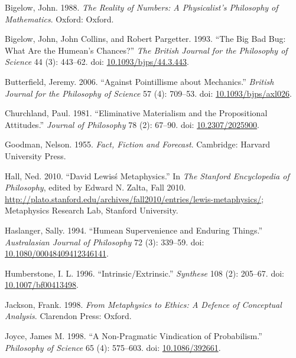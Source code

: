 \documentclass[
  11pt,
  letterpaper,
  DIV=11,
  numbers=noendperiod,
  twoside]{scrartcl}
\newlength{\cslhangindent}
\newenvironment{CSLReferences}[2] %
 {\begin{list}{}{%
  \setlength{\itemindent}{0pt}
  \setlength{\leftmargin}{0pt}
  \setlength{\parsep}{0pt}
  \ifodd #1
   \setlength{\leftmargin}{\cslhangindent}
   \setlength{\itemindent}{-1\cslhangindent}
  \fi
  \setlength{\itemsep}{#2\baselineskip}}}
 {\end{list}}
\begin{document}
\label{refs}
\begin{CSLReferences}{1}{0}
Bigelow, John. 1988. \emph{The Reality of Numbers: A Physicalist's
Philosophy of Mathematics}. Oxford: Oxford.

Bigelow, John, John Collins, and Robert Pargetter. 1993. {``The Big Bad
Bug: What Are the Humean's Chances?''} \emph{The British Journal for the
Philosophy of Science} 44 (3): 443--62. doi:
\href{https://doi.org/10.1093/bjps/44.3.443}{10.1093/bjps/44.3.443}.

Butterfield, Jeremy. 2006. {``Against Pointillisme about Mechanics.''}
\emph{British Journal for the Philosophy of Science} 57 (4): 709--53.
doi: \href{https://doi.org/10.1093/bjps/axl026}{10.1093/bjps/axl026}.

Churchland, Paul. 1981. {``Eliminative Materialism and the Propositional
Attitudes.''} \emph{Journal of Philosophy} 78 (2): 67--90. doi:
\href{https://doi.org/10.2307/2025900}{10.2307/2025900}.

Goodman, Nelson. 1955. \emph{Fact, Fiction and Forecast}. Cambridge:
Harvard University Press.

Hall, Ned. 2010. {``David Lewisś Metaphysics.''} In \emph{The Stanford
Encyclopedia of Philosophy}, edited by Edward N. Zalta, Fall 2010.
\url{http://plato.stanford.edu/archives/fall2010/entries/lewis-metaphysics/};
Metaphysics Research Lab, Stanford University.

Haslanger, Sally. 1994. {``Humean Supervenience and Enduring Things.''}
\emph{Australasian Journal of Philosophy} 72 (3): 339--59. doi:
\href{https://doi.org/10.1080/00048409412346141}{10.1080/00048409412346141}.

Humberstone, I. L. 1996. {``Intrinsic/Extrinsic.''} \emph{Synthese} 108
(2): 205--67. doi:
\href{https://doi.org/10.1007/bf00413498}{10.1007/bf00413498}.

Jackson, Frank. 1998. \emph{From Metaphysics to Ethics: A Defence of
Conceptual Analysis}. Clarendon Press: Oxford.

Joyce, James M. 1998. {``A Non-Pragmatic Vindication of Probabilism.''}
\emph{Philosophy of Science} 65 (4): 575--603. doi:
\href{https://doi.org/10.1086/392661}{10.1086/392661}.


\end{CSLReferences}
\end{document}
